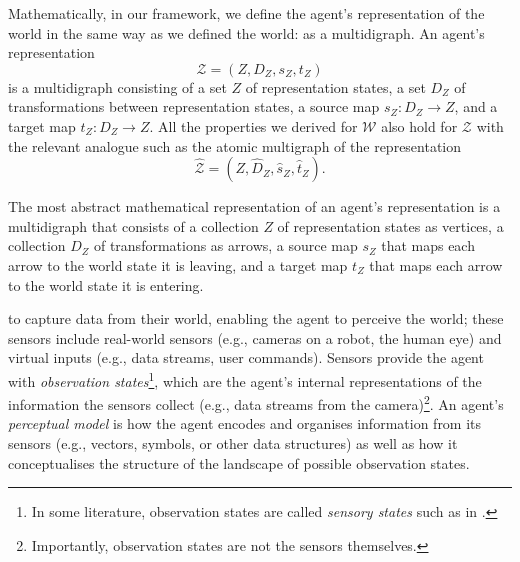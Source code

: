 Mathematically, in our framework, we define the agent's representation of the world in the same way as we defined the world: as a multidigraph.
An agent's representation
\begin{equation}
    \mathscr{Z} = (Z, D_{Z}, s_{Z}, t_{Z})
\end{equation}
is a multidigraph consisting of a set $Z$ of representation states, a set $D_{Z}$ of transformations between representation states, a source map $s_{Z}: D_{Z} \to Z$, and a target map $t_{Z}: D_{Z} \to Z$.
All the properties we derived for $\mathscr{W}$ also hold for $\mathscr{Z}$ with the relevant analogue such as the atomic multigraph of the representation
\begin{equation}
    \hat{\mathscr{Z}} = (Z, \hat{D}_{Z}, \hat{s}_{Z}, \hat{t}_{Z}).
\end{equation}

\begin{postulate}
    The most abstract mathematical representation of an agent's representation is a multidigraph that consists of a collection $Z$ of representation states as vertices, a collection $D_{Z}$ of transformations as arrows, a source map $s_{Z}$ that maps each arrow to the world state it is leaving, and a target map $t_{Z}$ that maps each arrow to the world state it is entering.
\end{postulate}

 to capture data from their world, enabling the agent to perceive the world; these sensors include real-world sensors (e.g., cameras on a robot, the human eye) and virtual inputs (e.g., data streams, user commands).
Sensors provide the agent with \emph{observation states}\footnote{In some literature, observation states are called \emph{sensory states} such as in \cite{Ramstead2020}.}, which are the agent's internal representations of the information the sensors collect (e.g., data streams from the camera)\footnote{
	Importantly, observation states are not the sensors themselves.
}.
An agent's \emph{perceptual model} is how the agent encodes and organises information from its sensors (e.g., vectors, symbols, or other data structures) as well as how it conceptualises the structure of the landscape of possible observation states.

